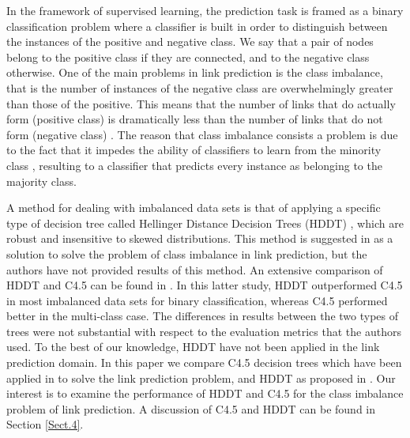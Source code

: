 \documentclass{acm_proc_article-sp}
\begin{document}
In the framework of supervised learning, the prediction task is framed as a binary classification problem where a classifier is built in order to distinguish between the instances of the positive and negative class. We say that a pair of nodes belong to the positive class if they are connected, and to the negative class otherwise. One of the main problems in link prediction is the class imbalance, that is the number of instances of the negative class are overwhelmingly greater than those of the positive. This means that the number of links that do actually form (positive class) is dramatically less than the number of links that do not form (negative class) \cite{Lichtenwalter:2010:NPM:1835804.1835837}. The reason that class imbalance consists a problem is due to the fact that it impedes the ability of classifiers to learn from the minority class \cite{Cieslak2012}, resulting to a classifier that predicts every instance as belonging to the majority class. 
 
A method for dealing with imbalanced data sets is that of applying a specific type of decision tree called Hellinger Distance Decision Trees (HDDT) \cite{Cieslak2008, Cieslak2012}, which are robust and insensitive to skewed distributions. This method is suggested in \cite{Lichtenwalter:2010:NPM:1835804.1835837} as a solution to solve the problem of class imbalance in link prediction, but the authors have not provided results of this method. An extensive comparison of HDDT and C4.5 can be found in \cite{Cieslak2012}. In this latter study, HDDT outperformed C4.5 in most imbalanced data sets for binary classification, whereas C4.5 performed better in the multi-class case. The differences in results between the two types of trees were not substantial with respect to the evaluation metrics that the authors used. To the best of our knowledge, HDDT have not been applied in the link prediction domain. In this paper we compare C4.5 decision trees \cite{quinlan2014c4} which have been applied in \cite{Hasan06linkprediction} to solve the link prediction problem, and HDDT as proposed in \cite{Lichtenwalter:2010:NPM:1835804.1835837}. Our interest is to examine the performance of HDDT and C4.5 for the class imbalance problem of link prediction. A discussion of C4.5 and HDDT can be found in Section \ref{Sect.4}. 

\end{document}
